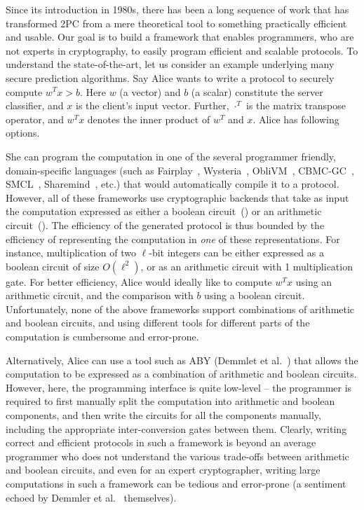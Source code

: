 Since its introduction in 1980s, there has been a long
sequence of work that has transformed 2PC from a mere theoretical tool to
something practically efficient and usable.
Our goal is to build a framework that enables programmers, who are not
experts in cryptography, to easily program efficient and scalable \mpc
protocols.  To understand the
state-of-the-art, let us consider an example underlying many
secure prediction algorithms. Say Alice wants to write
a \mpc protocol to securely
compute $w^Tx >b$. Here $w$ (a vector) and $b$ (a scalar) constitute
the server classifier, and $x$ is the client's input vector. Further,
$\cdot^{T}$ is the matrix transpose operator, and $w^Tx$ denotes the
inner product of  $w^{T}$ and $x$. Alice has following options.


She can program the computation in one of the several programmer
friendly, domain-specific languages (such
as Fairplay~\cite{fairplay}, Wysteria~\cite{wysteria},
ObliVM~\cite{oblivm}, CBMC-GC~\cite{cbmcgc}, SMCL~\cite{smcl},
Sharemind~\cite{sharemind}, \cite{lambdaps} etc.) that would
automatically compile it to a \mpc protocol. However, all of these
frameworks use cryptographic backends that take as input
the computation expressed as either a boolean
circuit~(\cite{yao,gmw}) or an arithmetic circuit~(\cite{sss,viff,gentry}). 
%
The efficiency of the generated \mpc protocol is thus bounded by the
efficiency of representing the computation in \emph{one} of
these representations. For instance, multiplication of two
$\ell$-bit integers can be either expressed as a boolean circuit of
size $O(\ell^2)$, or as an arithmetic circuit with 1 multiplication
gate.
%
For better efficiency, Alice would ideally like to compute
$w^Tx$ using an arithmetic circuit, and the comparison with $b$ using
a boolean circuit.
%
Unfortunately, none of the above frameworks support combinations of
arithmetic and boolean circuits, and using different tools for
different parts of the computation is cumbersome and error-prone.



Alternatively, Alice can use a tool such as ABY (Demmlet et
al.~\cite{aby}) that allows
the computation to be expressed as a combination of arithmetic and
boolean circuits. However, here, the programming interface is quite
low-level -- the programmer is required to first manually split the
computation into arithmetic and boolean components, and then write the
circuits for all the components manually, including the appropriate
inter-conversion gates between them. Clearly, writing correct
and efficient protocols in such a framework is beyond an average
programmer who does not understand the various trade-offs between
arithmetic and boolean circuits, and even for an expert cryptographer,
writing large computations in such a framework can be tedious and
error-prone (a sentiment echoed by Demmler et al.~\cite{aby} themselves).

